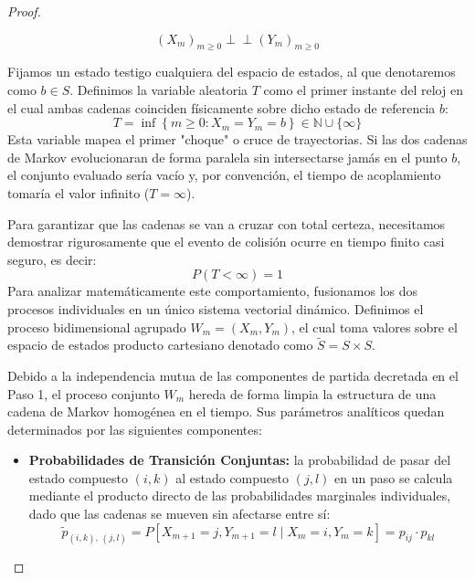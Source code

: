\begin{teo}
\begin{proof}
\begin{description}
\begin{enumerate}
        \[
        (X_m)_{m \ge 0} \perp\!\!\!\perp (Y_m)_{m \ge 0}
        \]
    \end{enumerate}
    \noindent
    Fijamos un estado testigo cualquiera del espacio de estados, al que denotaremos como $b \in S$. Definimos la variable aleatoria $T$ como el primer instante del reloj en el cual ambas cadenas coinciden físicamente sobre dicho estado de referencia $b$:
    \[
    T = \inf \left\{ m \ge 0 : X_m = Y_m = b \right\} \in \mathbb{N} \cup \{\infty\}
    \]
    Esta variable mapea el primer "choque" o cruce de trayectorias. Si las dos cadenas de Markov evolucionaran de forma paralela sin intersectarse jamás en el punto $b$, el conjunto evaluado sería vacío y, por convención, el tiempo de acoplamiento tomaría el valor infinito ($T = \infty$).

    \item[\tbf{Step 2.}] Para garantizar que las cadenas se van a cruzar con total certeza, necesitamos demostrar rigurosamente que el evento de colisión ocurre en tiempo finito casi seguro, es decir:
    \[
    P(T < \infty) = 1
    \]
    Para analizar matemáticamente este comportamiento, fusionamos los dos procesos individuales en un único sistema vectorial dinámico. Definimos el proceso bidimensional agrupado $W_m = (X_m, Y_m)$, el cual toma valores sobre el espacio de estados producto cartesiano denotado como $\widetilde{S} = S \times S$.

    
    Debido a la independencia mutua de las componentes de partida decretada en el Paso 1, el proceso conjunto $W_m$ hereda de forma limpia la estructura de una cadena de Markov homogénea en el tiempo. Sus parámetros analíticos quedan determinados por las siguientes componentes:

    \begin{itemize}
        \item \textbf{Probabilidades de Transición Conjuntas:} la probabilidad de pasar del estado compuesto $(i,k)$ al estado compuesto $(j,l)$ en un paso se calcula mediante el producto directo de las probabilidades marginales individuales, dado que las cadenas se mueven sin afectarse entre sí:
        \[
        \widetilde{p}_{(i,k), \, (j,l)} = P\left[X_{m+1}=j, Y_{m+1}=l \mid X_m=i, Y_m=k\right] = p_{ij} \cdot p_{kl}
        \]
        

\end{itemize}
\end{description}
\end{proof}
\end{teo}
